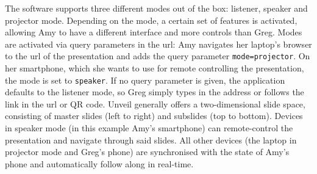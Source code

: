 The software supports three different modes out of the box: listener, speaker and projector mode. Depending on the mode, a certain set of features is activated, allowing Amy to have a different interface and more controls than Greg. Modes are activated via query parameters in the url: Amy navigates her laptop's browser to the url of the presentation and adds the query parameter \texttt{mode=projector}. On her smartphone, which she wants to use for remote controlling the presentation, the mode is set to \texttt{speaker}. If no query parameter is given, the application defaults to the listener mode, so Greg simply types in the address or follows the link in the url or QR code. Unveil generally offers a two-dimensional slide space, consisting of master slides (left to right) and subslides (top to bottom). Devices in speaker mode (in this example Amy's smartphone) can remote-control the presentation and navigate through said slides. All other devices (the laptop in projector mode and Greg's phone) are synchronised with the state of Amy's phone and automatically follow along in real-time.



